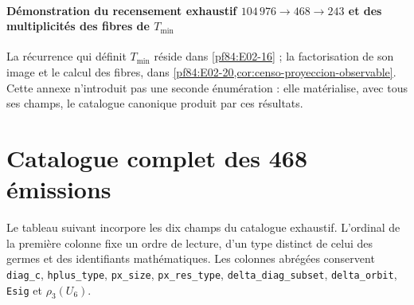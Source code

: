 \paragraph{Démonstration du recensement exhaustif \(104\,976\to468\to243\) et des multiplicités des fibres de \(T_{\min}\)}
La récurrence qui définit \(T_{\min}\) réside dans
\cref{pf84:E02-16} ; la factorisation de son image et le calcul des fibres,
dans \cref{pf84:E02-20,cor:censo-proyeccion-observable}. Cette annexe n'introduit pas
une seconde énumération : elle matérialise, avec tous ses champs, le
catalogue canonique produit par ces résultats.

\section{Catalogue complet des 468 émissions}

Le tableau suivant incorpore les dix champs du catalogue exhaustif.
L'ordinal de la première colonne fixe un ordre de lecture, d'un type distinct
de celui des germes et des identifiants mathématiques. Les colonnes
abrégées conservent
\texttt{diag\_c}, \texttt{hplus\_type}, \texttt{px\_size},
\texttt{px\_res\_type}, \texttt{delta\_diag\_subset},
    \texttt{delta\_orbit}, \texttt{Esig} et \(\rho_3(U_6)\).

